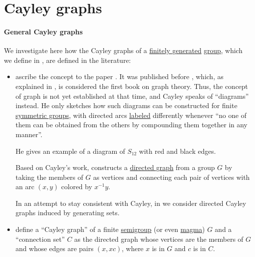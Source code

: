 \section{Cayley graphs}\label{sec:cayley_graphs}

\paragraph{General Cayley graphs}

\begin{remark}\label{rem:cayley_graph_overview}
  We investigate here how the Cayley graphs of a \hyperref[def:group_presentation]{finitely generated} \hyperref[def:group]{group}, which we define in , are defined in the literature:
  \begin{itemize}
    \item {} ascribe the concept to the paper . It was published before \cite{König1986Graphentheorie}, which, as explained in , is considered the first book on graph theory. Thus, the concept of graph is not yet established at that time, and Cayley speaks of \enquote{diagrams} instead. He only sketches how such diagrams can be constructed for finite \hyperref[def:symmetric_group]{symmetric groups}, with directed arcs \hyperref[def:labeled_set]{labeled} differently whenever \enquote{no one of them can be obtained from the others by compounding them together in any manner}.

    He gives an example of a diagram of \( S_{12} \) with red and black edges.

    Based on Cayley's work,  constructs a \hyperref[def:directed_graph]{directed graph} from a group \( G \) by taking the members of \( G \) as vertices and connecting each pair of vertices with an arc \( (x, y) \) colored by \( x^{-1} y \).

    In an attempt to stay consistent with Cayley, in  we consider directed Cayley graphs induced by generating sets.

    \item {} define a \enquote{Cayley graph} of a finite \hyperref[def:semigroup]{semigroup} (or even \hyperref[rem:magma_terminology]{magma}) \( G \) and a \enquote{connection set} \( C \) as the directed graph whose vertices are the members of \( G \) and whose edges are pairs \( (x, xc) \), where \( x \) is in \( G \) and \( c \) is in \( C \).


\end{itemize}
\end{remark}
